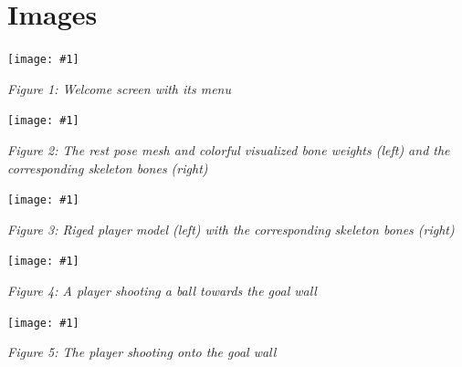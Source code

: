 \documentclass[a4paper,pagesize 10pt]{scrartcl}
\newcommand{\image}[3]{
	\begin{center}
		\texttt{[image: \#1]}
		\
		\begin{flushleft}
			\begin{center}
				\textit{#2}
			\end{center}
		\end{flushleft}
	\end{center}
}
\begin{document}
\section{Images}
  \image{../Screenshots/intro.png}{Figure 1: Welcome screen with its menu}{400px}
  \image{../Screenshots/weight_colors_cropped.png}{Figure 2: The rest pose mesh and colorful visualized bone weights (left) and the corresponding skeleton bones (right)}{400px}
  \image{../Screenshots/weight_texture.png}{Figure 3: Riged player model (left) with the corresponding skeleton bones (right)}{400px}
  \image{../Screenshots/main/shooting_scene.png}{Figure 4: A player shooting a ball towards the goal wall}{400px}
  \image{../Screenshots/main/main_goal.png}{Figure 5: The player shooting onto the goal wall}{400px}

{\small
	
	
}
\end{document}
